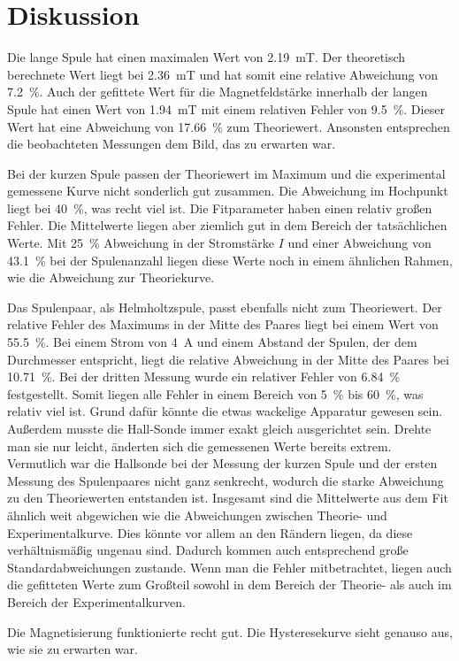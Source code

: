 \section{Diskussion}
\label{sec:Diskussion}

Die lange Spule hat einen maximalen Wert von \SI{2.19}{\milli\tesla}. Der theoretisch berechnete Wert liegt bei %
\SI{2.36}{\milli\tesla} und hat somit eine relative Abweichung von \SI{7.2}{\percent}. Auch der gefittete Wert für die Magnetfeldstärke innerhalb der langen Spule hat einen Wert von \SI{1.94}{\milli\tesla} mit einem relativen Fehler von \SI{9.5}{\percent}. Dieser Wert hat eine Abweichung von \SI{17.66}{\percent} zum Theoriewert. Ansonsten entsprechen die 
beobachteten Messungen dem Bild, das zu erwarten war.

\noindent Bei der kurzen Spule passen der Theoriewert im Maximum und die experimental gemessene Kurve nicht sonderlich gut zusammen. Die Abweichung im 
Hochpunkt liegt bei \SI{40}{\percent}, was recht viel ist. Die Fitparameter haben einen relativ großen Fehler. Die Mittelwerte liegen aber ziemlich gut in dem Bereich der tatsächlichen Werte. Mit \SI{25}{\percent} Abweichung in der Stromstärke $I$ und einer Abweichung von \SI{43,1}{\percent} bei der Spulenanzahl liegen diese Werte noch in einem ähnlichen Rahmen, wie die Abweichung zur Theoriekurve.   

\noindent Das Spulenpaar, als Helmholtzspule, passt ebenfalls nicht zum Theoriewert. Der relative Fehler des Maximums in der Mitte 
des Paares liegt bei einem Wert von \SI{55.5}{\percent}. %
Bei einem Strom von \SI{4}{\ampere} und einem Abstand der Spulen, der dem Durchmesser entspricht, liegt die relative Abweichung in der Mitte des Paares bei \SI{10.71}{\percent}. %
Bei der dritten Messung wurde ein %
relativer Fehler von \SI{6.84}{\percent} festgestellt. Somit liegen alle Fehler in einem Bereich von \SI{5}{\percent} 
bis \SI{60}{\percent}, was relativ viel ist. Grund dafür könnte die etwas wackelige Apparatur gewesen sein. %
Außerdem musste die Hall-Sonde immer exakt gleich ausgerichtet sein. Drehte man sie nur leicht, änderten sich die %
gemessenen Werte bereits extrem.
\newline
Vermutlich war die Hallsonde bei der Messung der kurzen Spule und der ersten Messung %
des Spulenpaares nicht ganz senkrecht, wodurch die starke Abweichung zu den Theoriewerten entstanden ist. 
Insgesamt sind die Mittelwerte aus dem Fit ähnlich weit abgewichen wie die Abweichungen zwischen Theorie- und Experimentalkurve. Dies könnte vor allem an den Rändern liegen, da diese verhältnismäßig ungenau sind. Dadurch kommen auch entsprechend große Standardabweichungen zustande. Wenn man die Fehler mitbetrachtet, liegen auch die gefitteten Werte zum Großteil sowohl in dem Bereich der Theorie- als auch im Bereich der Experimentalkurven.

\noindent Die Magnetisierung funktionierte recht gut. Die Hysteresekurve sieht genauso aus, wie sie zu erwarten war. %
